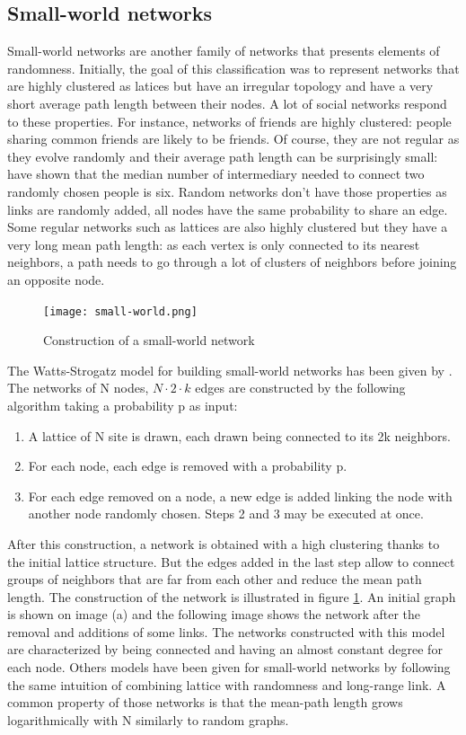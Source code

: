 \documentclass[a4paper, 12pt]{report}
\begin{document}
\subsection{Small-world networks}
\label{sm-section}
Small-world networks are another family of networks that presents elements of randomness. Initially, the goal of this classification was to represent networks that are highly clustered as latices but have an irregular topology and have a very short average path length between their nodes. A lot of social networks respond to these properties. For instance, networks of friends are highly clustered: people sharing common friends are likely to be friends. Of course, they are not regular as they evolve randomly and their average path length can be surprisingly small: \cite{milgram} have shown that the median number of intermediary needed to connect two randomly chosen people is six. Random networks don't have those properties as links are randomly added, all nodes have the same probability to share an edge. Some regular networks such as lattices are also highly clustered but they have a very long mean path length: as each vertex is only connected to its nearest neighbors, a path needs to go through a lot of clusters of neighbors before joining an opposite node. \citep{complex_networks} \\

\begin{figure}
\centering
\texttt{[image: small-world.png]}
\caption{Construction of a small-world network \citep{small-world}}
\label{small-world_pictures}
\end{figure}


The Watts-Strogatz model for building small-world networks has been given by \cite{globalClustering1}. The networks of N nodes, $N \cdot 2 \cdot k$ edges are constructed by the following algorithm taking a probability p as input:
\begin{enumerate}
\item A lattice of N site is drawn, each drawn being connected to its 2k neighbors.
\item For each node, each edge is removed with a probability p.
\item For each edge removed on a node, a new edge is added linking the node with another node randomly chosen. Steps 2 and 3 may be executed at once.
\end{enumerate}
After this construction, a network is obtained with a high clustering thanks to the initial lattice structure. But the edges added in the last step allow to connect groups of neighbors that are far from each other and reduce the mean path length. The construction of the network is illustrated in figure \ref{small-world_pictures}. An initial graph is shown on image (a) and the following image shows the network after the removal and additions of some links. The networks constructed with this model are characterized by being connected and having an almost constant degree for each node. Others models have been given for small-world networks by following the same intuition of combining lattice with randomness and long-range link. A common property of those networks is that the mean-path length grows logarithmically with N similarly to random graphs.\citep{small-world, complex_networks}
\end{document}
